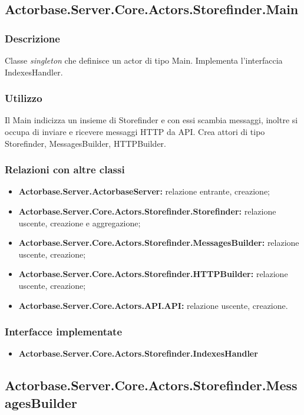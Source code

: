 \documentclass[a4paper]{article}
\begin{document}
		\subsection{Actorbase.Server.Core.Actors.Storefinder.Main}
			\subsubsection{Descrizione}
				Classe \emph{singleton} che definisce un actor di tipo Main. Implementa l'interfaccia IndexesHandler.
			\subsubsection{Utilizzo}
				Il Main indicizza un insieme di Storefinder e con essi scambia messaggi, inoltre si occupa di inviare e ricevere messaggi HTTP da API. Crea attori di tipo Storefinder, MessagesBuilder, HTTPBuilder.
			\subsubsection{Relazioni con altre classi}
			\begin{itemize}
				\item \textbf{Actorbase.Server.ActorbaseServer:} relazione entrante, creazione;
				\item \textbf{Actorbase.Server.Core.Actors.Storefinder.Storefinder:} relazione uscente, creazione e aggregazione;
				\item \textbf{Actorbase.Server.Core.Actors.Storefinder.MessagesBuilder:} relazione uscente, creazione;
				\item \textbf{Actorbase.Server.Core.Actors.Storefinder.HTTPBuilder:} relazione uscente, creazione;
				\item \textbf{Actorbase.Server.Core.Actors.API.API:} relazione uscente, creazione.
			\end{itemize}
			\subsubsection{Interfacce implementate}
			\begin{itemize}
				\item \textbf{Actorbase.Server.Core.Actors.Storefinder.IndexesHandler} 
			\end{itemize}

		\subsection{Actorbase.Server.Core.Actors.Storefinder.MessagesBuilder}
\end{document}
